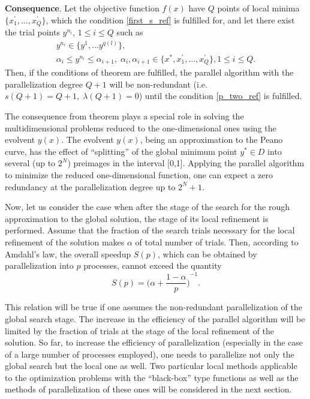 \documentclass[runningheads]{llncs}
\begin{document}
\textbf{Consequence}. Let the objective function $f(x)$ have $Q$ points of local minima $\{x_1^{\prime},...,x_Q^{\prime}\}$, which the condition \eqref{first_s_ref} is fulfilled for, and let there exist the trial points $y^{n_i}$, $1 \leq i \leq Q$ such as 
\begin{gather} 
    y^{n_i} \in \{y^1,...y^{q(l)}\}, \nonumber \\ 
    \alpha_i \leq y^{n_i} \leq \alpha_{i+1}, \; \alpha_i, \alpha_{i+1} \in \{x^*, x_1^{\prime},...,x_Q^{\prime}\}, 1 \leq i \leq Q. \nonumber
\end{gather}
Then, if the conditions of theorem are fulfilled, the parallel algorithm with the parallelization degree $Q+1$ will be non-redundant (i.e. $s(Q+1)=Q+1, \; \lambda(Q+1)=0$) until the condition \eqref{p_two_ref} is fulfilled.

The consequence from theorem plays a special role in solving the multidimensional problems reduced to the one-dimensional ones using the evolvent $y(x)$. The evolvent $y(x)$, being an approximation to the Peano curve, has the effect of ``splitting'' of the global minimum point $y^* \in D$ into several (up to $2^N$) preimages in the interval [0,1]. Applying the parallel algorithm to minimize the reduced one-dimensional function, one can expect a zero redundancy at the parallelization degree up to $2^N+1$.

Now, let us consider the case when after the stage of the search for the rough approximation to the global solution, the stage of its local refinement is performed. Assume that the fraction of the search trials necessary for the local refinement of the solution makes $\alpha$ of total number of trials. Then, according to Amdahl's law, the overall speedup $S(p)$, which can be obtained by parallelization into $p$ processes, cannot exceed the quantity 
$$ S(p) = {\Big(\alpha + \frac{1-\alpha}{p}\Big)}^{-1}.$$

This relation will be true if one assumes the non-redundant parallelization of the global search stage. The increase in the efficiency of the parallel algorithm will be limited by the fraction of trials at the stage of the local refinement of the solution. So far, to increase the efficiency of parallelization (especially in the case of a large number of processes employed), one needs to parallelize not only the global search but the local one as well. Two particular local methods applicable to the optimization problems with the ``black-box'' type functions as well as the methods of parallelization of these ones will be considered in the next section.
\end{document}
